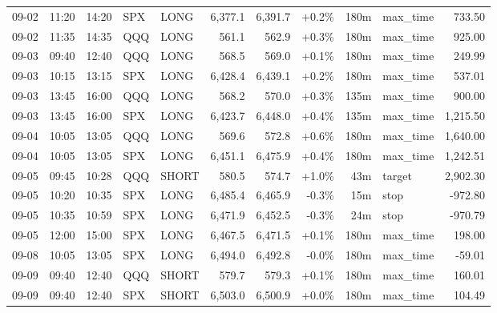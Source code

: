 \documentclass[11pt,a4paper,twoside]{article}
\begin{document}
\begin{center}
\begin{longtable}{>{\color{txtmain}}l l l l l r r r r >{\color{txtmain}}l r}
09-02 & 11:20 & 14:20 & SPX & LONG & 6,377.1 & 6,391.7 & \textcolor{wingreen}{+0.2\%} & 180m & max\_time & \textcolor{wingreen}{733.50} \\
09-02 & 11:35 & 14:35 & QQQ & LONG & 561.1 & 562.9 & \textcolor{wingreen}{+0.3\%} & 180m & max\_time & \textcolor{wingreen}{925.00} \\
09-03 & 09:40 & 12:40 & QQQ & LONG & 568.5 & 569.0 & \textcolor{wingreen}{+0.1\%} & 180m & max\_time & \textcolor{wingreen}{249.99} \\
09-03 & 10:15 & 13:15 & SPX & LONG & 6,428.4 & 6,439.1 & \textcolor{wingreen}{+0.2\%} & 180m & max\_time & \textcolor{wingreen}{537.01} \\
09-03 & 13:45 & 16:00 & QQQ & LONG & 568.2 & 570.0 & \textcolor{wingreen}{+0.3\%} & 135m & max\_time & \textcolor{wingreen}{900.00} \\
09-03 & 13:45 & 16:00 & SPX & LONG & 6,423.7 & 6,448.0 & \textcolor{wingreen}{+0.4\%} & 135m & max\_time & \textcolor{wingreen}{1,215.50} \\
09-04 & 10:05 & 13:05 & QQQ & LONG & 569.6 & 572.8 & \textcolor{wingreen}{+0.6\%} & 180m & max\_time & \textcolor{wingreen}{1,640.00} \\
09-04 & 10:05 & 13:05 & SPX & LONG & 6,451.1 & 6,475.9 & \textcolor{wingreen}{+0.4\%} & 180m & max\_time & \textcolor{wingreen}{1,242.51} \\
09-05 & 09:45 & 10:28 & QQQ & SHORT & 580.5 & 574.7 & \textcolor{wingreen}{+1.0\%} & 43m & target & \textcolor{wingreen}{2,902.30} \\
09-05 & 10:20 & 10:35 & SPX & LONG & 6,485.4 & 6,465.9 & \textcolor{lossred}{-0.3\%} & 15m & stop & \textcolor{lossred}{-972.80} \\
09-05 & 10:35 & 10:59 & SPX & LONG & 6,471.9 & 6,452.5 & \textcolor{lossred}{-0.3\%} & 24m & stop & \textcolor{lossred}{-970.79} \\
09-05 & 12:00 & 15:00 & SPX & LONG & 6,467.5 & 6,471.5 & \textcolor{wingreen}{+0.1\%} & 180m & max\_time & \textcolor{wingreen}{198.00} \\
09-08 & 10:05 & 13:05 & SPX & LONG & 6,494.0 & 6,492.8 & \textcolor{lossred}{-0.0\%} & 180m & max\_time & \textcolor{lossred}{-59.01} \\
09-09 & 09:40 & 12:40 & QQQ & SHORT & 579.7 & 579.3 & \textcolor{wingreen}{+0.1\%} & 180m & max\_time & \textcolor{wingreen}{160.01} \\
09-09 & 09:40 & 12:40 & SPX & SHORT & 6,503.0 & 6,500.9 & \textcolor{wingreen}{+0.0\%} & 180m & max\_time & \textcolor{wingreen}{104.49} \\

\end{longtable}
\end{center}
\end{document}

